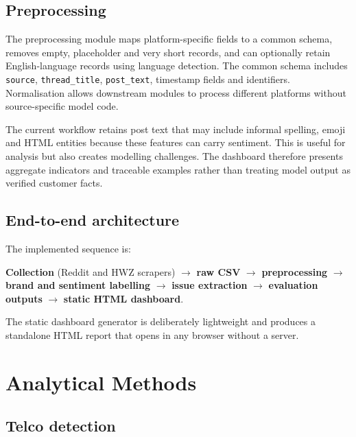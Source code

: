 \documentclass[11pt,a4paper]{article}
\begin{document}
\subsection{Preprocessing}

The preprocessing module maps platform-specific fields to a common schema, removes empty, placeholder and very short records, and can optionally retain English-language records using language detection. The common schema includes \texttt{source}, \texttt{thread\_title}, \texttt{post\_text}, timestamp fields and identifiers. Normalisation allows downstream modules to process different platforms without source-specific model code.

The current workflow retains post text that may include informal spelling, emoji and HTML entities because these features can carry sentiment. This is useful for analysis but also creates modelling challenges. The dashboard therefore presents aggregate indicators and traceable examples rather than treating model output as verified customer facts.

\subsection{End-to-end architecture}

The implemented sequence is:

\begin{center}
\begin{minipage}{0.92\textwidth}
\small
\textbf{Collection} (Reddit and HWZ scrapers)
$\rightarrow$ \textbf{raw CSV}
$\rightarrow$ \textbf{preprocessing}
$\rightarrow$ \textbf{brand and sentiment labelling}
$\rightarrow$ \textbf{issue extraction}
$\rightarrow$ \textbf{evaluation outputs}
$\rightarrow$ \textbf{static HTML dashboard}.
\end{minipage}
\end{center}

The static dashboard generator is deliberately lightweight and produces a standalone HTML report that opens in any browser without a server.

\section{Analytical Methods}

\subsection{Telco detection}
\end{document}
